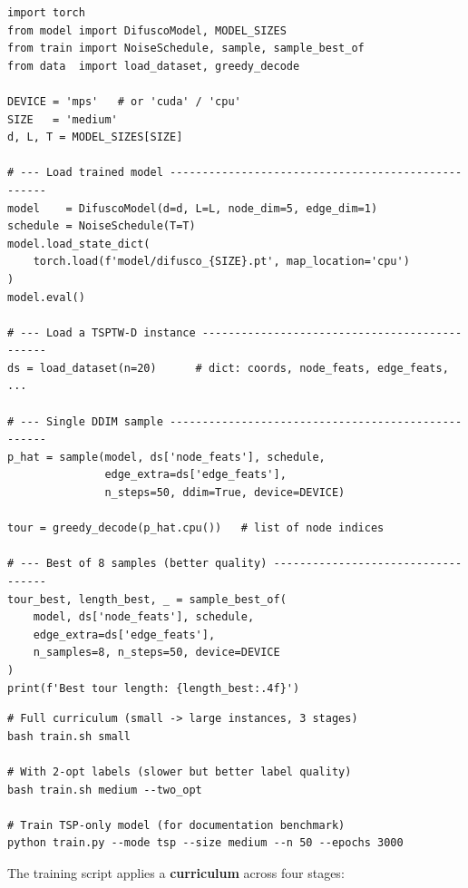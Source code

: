 \documentclass[12pt,a4paper]{article}
\begin{document}
\begin{lstlisting}[style=pythonstyle,
  caption={Load model, run DDIM inference, decode tour
           (\texttt{model.py} + \texttt{train.py})}]
import torch
from model import DifuscoModel, MODEL_SIZES
from train import NoiseSchedule, sample, sample_best_of
from data  import load_dataset, greedy_decode

DEVICE = 'mps'   # or 'cuda' / 'cpu'
SIZE   = 'medium'
d, L, T = MODEL_SIZES[SIZE]

# --- Load trained model ---------------------------------------------------
model    = DifuscoModel(d=d, L=L, node_dim=5, edge_dim=1)
schedule = NoiseSchedule(T=T)
model.load_state_dict(
    torch.load(f'model/difusco_{SIZE}.pt', map_location='cpu')
)
model.eval()

# --- Load a TSPTW-D instance ----------------------------------------------
ds = load_dataset(n=20)      # dict: coords, node_feats, edge_feats, ...

# --- Single DDIM sample ---------------------------------------------------
p_hat = sample(model, ds['node_feats'], schedule,
               edge_extra=ds['edge_feats'],
               n_steps=50, ddim=True, device=DEVICE)

tour = greedy_decode(p_hat.cpu())   # list of node indices

# --- Best of 8 samples (better quality) -----------------------------------
tour_best, length_best, _ = sample_best_of(
    model, ds['node_feats'], schedule,
    edge_extra=ds['edge_feats'],
    n_samples=8, n_steps=50, device=DEVICE
)
print(f'Best tour length: {length_best:.4f}')
\end{lstlisting}

\begin{lstlisting}[style=bashstyle,
  caption={Training pipeline (run from \texttt{DL\_MODEL/difusco/})}]
# Full curriculum (small -> large instances, 3 stages)
bash train.sh small

# With 2-opt labels (slower but better label quality)
bash train.sh medium --two_opt

# Train TSP-only model (for documentation benchmark)
python train.py --mode tsp --size medium --n 50 --epochs 3000
\end{lstlisting}

The training script applies a \textbf{curriculum} across four stages:
\end{document}
